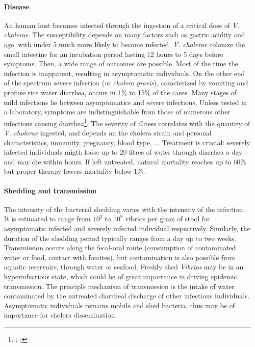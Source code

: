\paragraph{Disease} An human host becomes infected through the ingestion of a critical dose of \emph{V. cholerae}. The susceptibility depends on many factors such as gastric acidity and age, with under 5 much more likely to become infected\cite{Sack:Cholera:2004}. \textit{V. cholerae} colonize the small intestine for an incubation period lasting 12 hours to 5 days\cite{Azman:IncubationPeriodCholera:2013} before symptoms. Then, a wide range of outcomes are possible. Most of the time the infection is inapparent, resulting in asymptomatic individuals. On the other end of the spectrum severe infection (or \emph{cholera gravis}), caracterized by vomiting and profuse rice water diarrhea, occurs in 1\% to 15\% of the cases. Many stages of mild infections lie between asymptomatics and severe infections. Unless tested in a laboratory, symptoms are indistinguishable  from those of numerous other infections causing diarrhea\footnote{;  ; }.  The severity of illness correlates with the quantity of \textit{V. cholerae} ingested\cite{Brouwer:DoseresponseRelationshipsEnvironmentally:2017}, and depends on the cholera strain and personal characteristics, immunity, pregnancy, blood type\cite{WHO:CholeraVaccinesWHO:2017,Azman:IncubationPeriodCholera:2013}, ...%
Treatment is crucial: severely infected individuals migth loose up to 20 litres of water through diarrhea a day and may die within hours. If left untreated, natural mortality reaches up to 60\% but proper therapy lowers mortality below 1\%\cite{Luquero:MortalityRatesCholera:2016}.

\paragraph{Shedding and transmission} The intensity of the bacterial shedding varies with the intensity of the infection. It is estimated to range from $10^3$ to $10^{9}$ vibrios per gram of stool for asymptomatic infected and severely infected individual respectively. Similarly, the duration of the shedding period typically ranges from a day up to two weeks.
Transmission occurs along the fecal-oral route (consumption of contaminated water or food, contact with fomites), but contamination is also possible from aquatic reservoirs, through water or seafood. Freshly shed \textit{Vibrios} may be in an hyperinfectious state, which could be of great importance in driving epidemic transmission\cite{Butler:CholeraStoolBacteria:2006}. The principle mechanism of transmission is the intake of water contaminated by the untreated diarrheal discharge of other infectious individuals.
Asymptomatic individuals remains mobile and shed bacteria, thus may be of importance for cholera dissemination.

